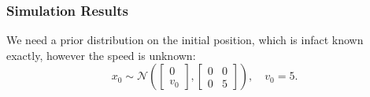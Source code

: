\documentclass[11pt]{article}\usepackage[]{graphicx}\usepackage[]{color}
\begin{document}
\subsubsection{Simulation Results}

We need a prior distribution on the initial position, which is infact known exactly, however the
speed is unknown:
\begin{equation}
  \label{eq:prior}
  x_0 \sim \mathcal{N}\left(
    \begin{bmatrix}
      0 \\ v_0
    \end{bmatrix},
    \begin{bmatrix}
      0 & 0 \\
      0 & 5
    \end{bmatrix}
  \right),\quad v_0 = 5.
\end{equation}
\end{document}
